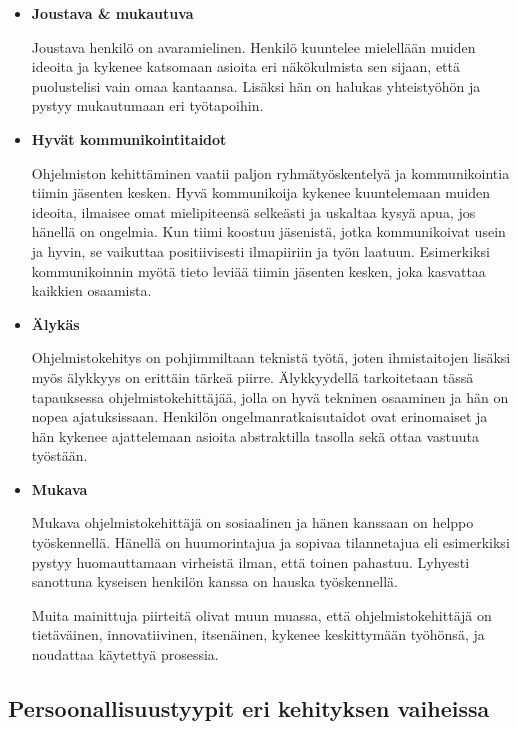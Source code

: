 \documentclass[finnish]{../tktltiki2}
\theoremstyle{definition}
\theoremstyle{remark}
\begin{document}
\begin{itemize}

\item {\bf Joustava \& mukautuva}

Joustava henkilö on avaramielinen. Henkilö kuuntelee mielellään muiden
ideoita ja kykenee katsomaan asioita eri näkökulmista sen sijaan, että
puolustelisi vain omaa kantaansa. Lisäksi hän on halukas yhteistyöhön
ja pystyy mukautumaan eri työtapoihin.

\item {\bf Hyvät kommunikointitaidot}

Ohjelmiston kehittäminen vaatii paljon ryhmätyöskentelyä ja
kommunikointia tiimin jäsenten kesken. Hyvä kommunikoija kykenee
kuuntelemaan muiden ideoita, ilmaisee omat mielipiteensä selkeästi ja uskaltaa
kysyä apua, jos hänellä on ongelmia. Kun tiimi koostuu jäsenistä,
jotka kommunikoivat usein ja hyvin, se vaikuttaa positiivisesti
ilmapiiriin ja työn laatuun. Esimerkiksi kommunikoinnin myötä
tieto leviää tiimin jäsenten kesken, joka kasvattaa kaikkien osaamista.

\item {\bf Älykäs}

Ohjelmistokehitys on pohjimmiltaan teknistä työtä, joten
ihmistaitojen lisäksi myös älykkyys on erittäin tärkeä piirre.
Älykkyydellä tarkoitetaan tässä tapauksessa ohjelmistokehittäjää, jolla on hyvä tekninen osaaminen ja hän on nopea
ajatuksissaan. Henkilön ongelmanratkaisutaidot ovat erinomaiset
ja hän kykenee ajattelemaan asioita abstraktilla tasolla sekä ottaa
vastuuta työstään.

\item {\bf Mukava}

Mukava ohjelmistokehittäjä on sosiaalinen ja hänen kanssaan on
helppo työskennellä. Hänellä on huumorintajua ja sopivaa
tilannetajua eli esimerkiksi pystyy huomauttamaan virheistä ilman,
että toinen pahastuu. Lyhyesti sanottuna kyseisen henkilön kanssa
on hauska työskennellä.

Muita mainittuja piirteitä olivat muun muassa, että ohjelmistokehittäjä
on tietäväinen, innovatiivinen, itsenäinen, kykenee keskittymään työhönsä, ja noudattaa käytettyä prosessia.

\end{itemize}

\subsection{Persoonallisuustyypit eri kehityksen vaiheissa}
\end{document}
